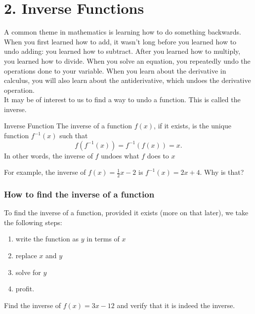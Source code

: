 \documentclass[12pt,fleqn]{book}
\begin{document}
        \chapter{2. Inverse Functions}
        A common theme in mathematics is learning how to do something backwards.  When you first learned how to add, it wasn't long before you learned how to undo adding: you learned how to subtract.  After you learned how to multiply, you learned how to divide.  When you solve an equation, you repeatedly undo the operations done to your variable.  When you learn about the derivative in calculus, you will also learn about the antiderivative, which undoes the derivative operation.
        \\[1em]
It may be of interest to us to find a way to undo a function.  This is called the inverse.
\begin{defn}{Inverse Function}{}
    The inverse of a function $f(x)$, if it exists, is the unique function $f^{-1}(x)$ such that
    \[
        f(f^{-1}(x))=f^{-1}(f(x))=x.
    \]
    In other words, the inverse of $f$ undoes what $f$ does to $x$
\end{defn}
For example, the inverse of $f(x)=\frac12 x - 2$ is $f^{-1}(x)=2x+4$.  Why is that?
\subsection*{How to find the inverse of a function}
To find the inverse of a function, provided it exists (more on that later), we take the following steps:
\begin{enumerate}
    \item write the function as $y$ in terms of $x$
    \item replace $x$ and $y$
    \item solve for $y$
    \item profit.
\end{enumerate}
Find the inverse of $f(x)=3x-12$ and verify that it is indeed the inverse.
\\[2in]
\end{document}
